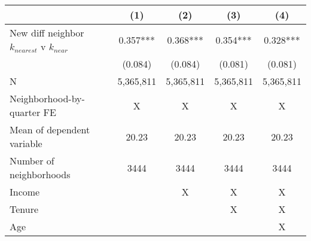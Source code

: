 \begin{tabular}{lcccc}
\toprule
  & (1) & (2) & (3) & (4) \\ 
\midrule
New diff neighbor $k_{nearest}$ v $k_{near}$ & 0.357*** & 0.368*** & 0.354*** & 0.328*** \\ 
 & (0.084) & (0.084) & (0.081) & (0.081) \\ 
\midrule
N & 5,365,811 & 5,365,811 & 5,365,811 & 5,365,811 \\ 
Neighborhood-by-quarter FE & X & X & X & X \\ 
Mean of dependent variable & 20.23 & 20.23 & 20.23 & 20.23 \\ 
Number of neighborhoods & 3444 & 3444 & 3444 & 3444 \\ 
Income &  & X & X & X \\ 
Tenure &  &  & X & X \\ 
Age &  &  &  & X \\ 
\bottomrule
\end{tabular}